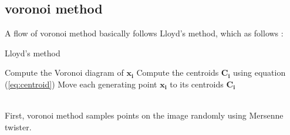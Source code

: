 \documentclass[11pt]{article}
\begin{document}
\subsection{voronoi method}
A flow of voronoi method basically follows Lloyd's method\cite{Okabe:1992:STC:135734}, which as follows : \\
\begin{algorithm}
\caption{Lloyd's method}\label{alg:lloyds}
\begin{algorithmic}[1]
    \State Compute the Voronoi diagram of $\mathbf{x_i}$
    \State Compute the centroids $\mathbf{C_i}$ using equation (\ref{eq:centroid})
    \State Move each generating point $\mathbf{x_i}$ to its centroids $\mathbf{C_i}$
\EndWhile
\end{algorithmic}
\end{algorithm}\\
First, voronoi method samples points on the image randomly using Mersenne twister.
\end{document}
